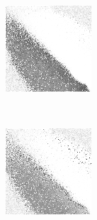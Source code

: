 
\begin{figure}
\center

	\begin{subfigure}[t]{0.22\textwidth}
		\center
		\includegraphics[width=\textwidth]{images/findings/experiments/regularization/strats/0.80/hand_max_min.png}
		\caption{\handmaxmin}
	\end{subfigure}
	~
	\begin{subfigure}[t]{0.22\textwidth}
		\center
		\includegraphics[width=\textwidth]{images/findings/experiments/regularization/strats/0.80/hand_max_avg.png}

\end{subfigure}
\end{figure}
